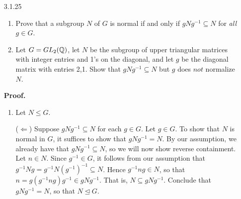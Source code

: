 \begin{enumerate}
      \textbf{Proof.} Suppose $N \trianglelefteq G$ and $H \le G$. We have
      $N \cap H \le H$ by Exercise 2.1.10(a), so it remains to show that
      $N \cap H$ is normal in $H$. Let $h \in H$ and $m \in N \cap H$. Since 
      $m \in N \cap H$, we must particularly have that $m \in N$. Since $N$ is 
      normal in $G$, we have that $hmh^{-1} \in N$. Also, we must have that
      $m \in H$ and by closure of $H$, it follows that $hmh^{-1} \in H$, so that
      $hmh^{-1} \in N \cap H$. Conclude by Theorem 6(5) that
      $N \cap H \trianglelefteq H$. \qed
   \item[3.1.25]  \begin{enumerate}
                     \item Prove that a subgroup $N$ of $G$ is normal if and
                           only if $gNg^{-1} \subseteq N$ for \textit{all}
                           $g \in G$.
                     \item Let $G = GL_2(\mathbb{Q})$, let $N$ be the subgroup of upper
                           triangular matrices with integer entries and 1's on
                           the diagonal, and let $g$ be the diagonal matrix with
                           entries 2,1. Show that $gNg^{-1} \subseteq N$ but $g$
                           does $\textit{not}$ normalize $N$.
                  \end{enumerate}

      \textbf{Proof.}

      \begin{enumerate}
         \item Let $N \le G$.

               ($\Leftarrow$) Suppose $gNg^{-1} \subseteq N$ for each $g \in G$.
               Let $g \in G$. To show that $N$ is normal in $G$, it suffices to
               show that $gNg^{-1} = N$. By our assumption, we already have that
               $gNg^{-1} \subseteq N$, so we will now show reverse containment.
               Let $n \in N$. Since $g^{-1} \in G$, it follows from our 
               assumption that $g^{-1}Ng = g^{-1}N(g^{-1})^{-1} \subseteq N$.
               Hence $g^{-1}ng \in N$, so that
               $n = g(g^{-1}ng)g^{-1} \in gNg^{-1}$. That is,
               $N \subseteq gNg^{-1}$. Conclude that $gNg^{-1} = N$, so that
               $N \trianglelefteq G$.
      

\end{enumerate}
\end{enumerate}
